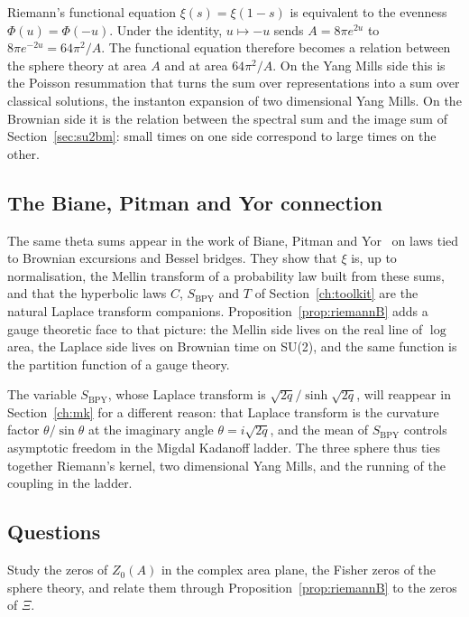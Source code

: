 Riemann's functional equation $\xi(s)=\xi(1-s)$ is equivalent to the evenness $\Phi(u)=\Phi(-u)$. Under the identity, $u\mapsto-u$ sends $A=8\pi e^{2u}$ to $8\pi e^{-2u}=64\pi^2/A$. The functional equation therefore becomes a relation between the sphere theory at area $A$ and at area $64\pi^2/A$. On the Yang Mills side this is the Poisson resummation that turns the sum over representations into a sum over classical solutions, the instanton expansion of two dimensional Yang Mills. On the Brownian side it is the relation between the spectral sum and the image sum of Section~\ref{sec:su2bm}: small times on one side correspond to large times on the other.

\subsection{The Biane, Pitman and Yor connection}

The same theta sums appear in the work of Biane, Pitman and Yor~\cite{BPY} on laws tied to Brownian excursions and Bessel bridges. They show that $\xi$ is, up to normalisation, the Mellin transform of a probability law built from these sums, and that the hyperbolic laws $C$, $S_{\mathrm{BPY}}$ and $T$ of Section~\ref{ch:toolkit} are the natural Laplace transform companions. Proposition~\ref{prop:riemannB} adds a gauge theoretic face to that picture: the Mellin side lives on the real line of $\log$ area, the Laplace side lives on Brownian time on SU(2), and the same function is the partition function of a gauge theory.

The variable $S_{\mathrm{BPY}}$, whose Laplace transform is $\sqrt{2q}/\sinh\sqrt{2q}$, will reappear in Section~\ref{ch:mk} for a different reason: that Laplace transform is the curvature factor $\theta/\sin\theta$ at the imaginary angle $\theta=i\sqrt{2q}$, and the mean of $S_{\mathrm{BPY}}$ controls asymptotic freedom in the Migdal Kadanoff ladder. The three sphere thus ties together Riemann's kernel, two dimensional Yang Mills, and the running of the coupling in the ladder.

\subsection{Questions}

\begin{problem}\label{op:exact1}
Study the zeros of $Z_0(A)$ in the complex area plane, the Fisher zeros of the sphere theory, and relate them through Proposition~\ref{prop:riemannB} to the zeros of $\Xi$.
\end{problem}

